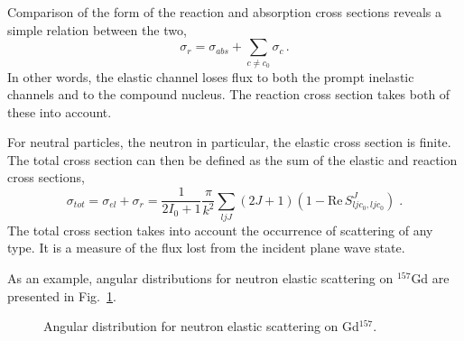 \documentclass[twocolumn,amsmath,amssymb,10pt,groupedaddress,letter]{revtex4}
\begin{document}
Comparison of the form of the reaction and absorption cross sections
reveals a simple relation between the two, \begin{equation}
\sigma_{r}=\sigma_{abs}+\sum_{c\neq c_{0}}\sigma_{c}\,.\end{equation}
 In other words, the elastic channel loses flux to both the prompt
inelastic channels and to the compound nucleus. The reaction
cross section takes both of these into account.

For neutral particles, the neutron in particular, the elastic cross
section is finite. The total cross section can then be defined as the
sum of the elastic and reaction cross sections, \begin{equation}
\sigma_{tot}=\sigma_{el}+\sigma_{r}=\frac{1}{2I_{0}+1}\frac{\pi}{k^{2}}\sum_{ljJ}(2J+1)(1-\textrm{Re}\, S_{ljc_{0},ljc_{0}}^{J})\;.\end{equation}
 The total cross section takes into account the occurrence of scattering
of any type. It is a measure of the flux lost from the incident plane
wave state.

As an example, angular distributions for neutron elastic scattering
on $^{157}$Gd are presented in Fig.~\ref{njoygd157}. %
\begin{figure}[htbp]

\caption{Angular distribution for neutron elastic scattering on Gd$^{157}$.}

\label{njoygd157}
\end{figure}
\end{document}
